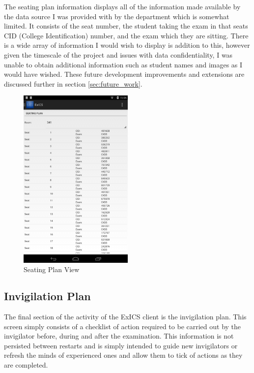 The seating plan information displays all of the information made available by the data source I was provided with by the department which is somewhat limited.  It consists of the seat number, the student taking the exam in that seats CID (College Identification) number, and the exam which they are sitting.  There is a wide array of information I would wish to display is addition to this, however given the timescale of the project and issues with data confidentiality, I was unable to obtain additional information such as student names and images as I would have wished.  These future development improvements and extensions are discussed further in section \ref{sec:future_work}.

\FloatBarrier

\begin{figure}[!htpb]
	\centering
	\includegraphics[width=0.5\textwidth]{"screenshots/t_p_sp"}
	\caption{Seating Plan View}
	\label{fig:spv}
\end{figure}

\FloatBarrier

\subsection{Invigilation Plan}

The final section of the activity of the ExICS client is the invigilation plan.  This screen simply consists of a checklist of action required to be carried out by the invigilator before, during and after the examination.  This information is not persisted between restarts and is simply intended to guide new invigilators or refresh the minds of experienced ones and allow them to tick of actions as they are completed.

